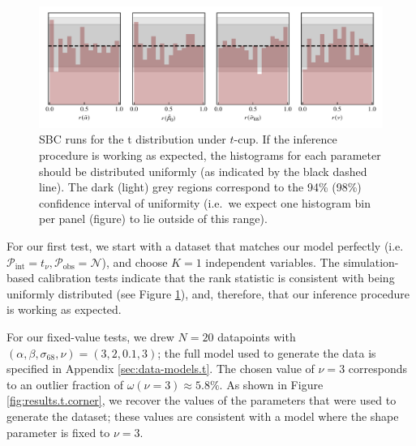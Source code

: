 \documentclass[fleqn,usenatbib]{rasti}
\begin{document}
\begin{figure}
    \includegraphics[width=\textwidth]{graphics/sbc/tcup_sbc.pdf}
    \caption{SBC runs for the t distribution under $t$-cup. If the inference
    procedure is working as expected, the histograms for each parameter should
    be distributed uniformly (as indicated by the black dashed line). The dark
    (light) grey regions correspond to the 94\% (98\%) confidence interval of
    uniformity (i.e.\ we expect one histogram bin per panel (figure) to lie
    outside of this range).}
    \label{fig:results.t.sbc}
\end{figure}

For our first test, we start with a dataset that matches our model perfectly
(i.e.\ $\mathcal P_{\text{int}} = t_\nu, \mathcal P_{\text{obs}} =
\mathcal{N}$), and choose $K=1$ independent variables. The simulation-based
calibration tests indicate that the rank statistic is consistent with being
uniformly distributed (see Figure \ref{fig:results.t.sbc}), and, therefore, that
our inference procedure is working as expected.

For our fixed-value tests, we drew $N = 20$ datapoints with $(\alpha, \beta,
\sigma_{68}, \nu) = (3, 2, 0.1, 3)$; the full model used to generate the data is
specified in Appendix \ref{sec:data-models.t}. The chosen value of $\nu = 3$
corresponds to an outlier fraction of $\omega(\nu = 3) \approx 5.8 \%$.  As
shown in Figure \ref{fig:results.t.corner}, we recover the values of the
parameters that were used to generate the dataset; these values are consistent
with a model where the shape parameter is fixed to $\nu = 3$.
\end{document}
